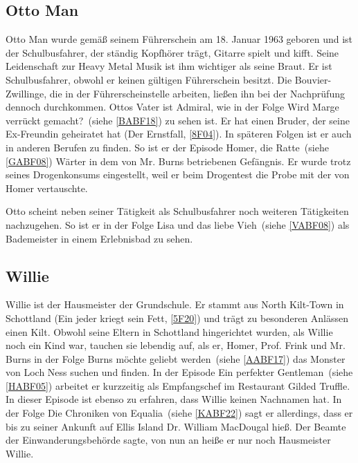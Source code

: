 \subsection{Otto Man}\label{OttoMan}
Otto Man wurde gemäß seinem Führerschein am 18. Januar 1963 geboren und ist der Schulbusfahrer, der ständig Kopfhörer trägt, Gitarre spielt und kifft. Seine Leidenschaft zur Heavy Metal Musik ist ihm wichtiger als seine Braut. Er ist Schulbusfahrer, obwohl er keinen gültigen Führerschein besitzt. Die Bouvier-Zwillinge, die in der Führerscheinstelle arbeiten, ließen ihn bei der Nachprüfung dennoch durchkommen. Ottos Vater ist Admiral, wie in der Folge \glqq Wird Marge verrückt gemacht?\grqq\ (siehe \ref{BABF18}) zu sehen ist. Er hat einen Bruder, der seine Ex-Freundin geheiratet hat (\glqq Der Ernstfall\grqq , \ref{8F04}). In späteren Folgen ist er auch in anderen Berufen zu finden. So ist er der Episode \glqq Homer, die Ratte\grqq\ (siehe \ref{GABF08}) Wärter in dem von Mr. Burns betriebenen Gefängnis. Er wurde trotz seines Drogenkonsums eingestellt, weil er beim Drogentest die Probe mit der von Homer vertauschte.

Otto scheint neben seiner Tätigkeit als Schulbusfahrer noch weiteren Tätigkeiten nachzugehen. So ist er in der Folge \glqq Lisa und das liebe Vieh\grqq\ (siehe \ref{VABF08}) als Bademeister in einem Erlebnisbad zu sehen.

 
\subsection{Willie}\label{Willie}
Willie ist der Hausmeister der Grundschule. Er stammt aus North Kilt-Town in Schottland (\glqq Ein jeder kriegt sein Fett\grqq , \ref{5F20}) und trägt zu besonderen Anlässen einen Kilt. Obwohl seine Eltern in Schottland hingerichtet wurden, als Willie noch ein Kind war, tauchen sie lebendig auf, als er, Homer, Prof. Frink und Mr. Burns in der Folge \glqq Burns möchte geliebt werden\grqq\ (siehe \ref{AABF17}) das Monster von Loch Ness suchen und finden. In der Episode \glqq Ein perfekter Gentleman\grqq\ (siehe \ref{HABF05}) arbeitet er kurzzeitig als Empfangschef im Restaurant \glqq Gilded Truffle\grqq . In dieser Episode ist ebenso zu erfahren, dass Willie keinen Nachnamen hat. In der Folge \glqq Die Chroniken von Equalia\grqq\ (siehe \ref{KABF22}) sagt er allerdings, dass er bis zu seiner Ankunft auf Ellis Island Dr. William MacDougal hieß. Der Beamte der Einwanderungsbehörde sagte, von nun an heiße er nur noch Hausmeister Willie. 

